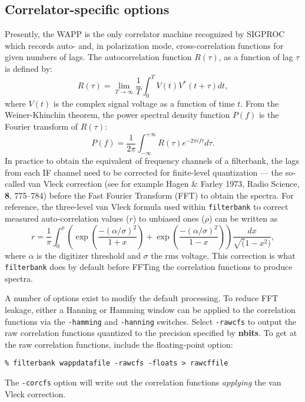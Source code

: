 \documentclass[11pt]{article}
\begin{document}
\subsection*{Correlator-specific options}
Presently, the WAPP is the only correlator machine recognized by SIGPROC
which records auto- and, in polarization mode, cross-correlation functions for 
given numbers of lags. The autocorrelation function $R(\tau)$, as a 
function of lag $\tau$ is defined by:
\begin{displaymath}
R(\tau) = \lim_{T\rightarrow\infty} \frac{1}{T} \int_0^T V(t) V^*(t+\tau) dt,
\end{displaymath}
where $V(t)$ is the complex signal voltage as a function of time $t$.
From the Weiner-Khinchin theorem, the power 
spectral density function $P(f)$ is the Fourier transform of $R(\tau)$:
\begin{displaymath}
P(f)=\frac{1}{2\pi} \int_{-\infty}^{+\infty} R(\tau) e^{-2\pi i f \tau} d\tau.
\end{displaymath}
In practice to obtain the equivalent of frequency channels of a
filterbank, the lags from each IF channel need to be corrected for
finite-level quantization --- the so-called van Vleck correction (see 
for example Hagen \& Farley 1973, Radio Science, {\bf 8}, 775--784)
before the Fast Fourier Transform (FFT) to obtain the spectra. For
reference, the three-level van Vleck formula used within {\tt filterbank} to 
correct measured auto-correlation values ($r$) to unbiased ones ($\rho$)
can be written as
\begin{displaymath}
r = \frac{1}{\pi} \int_0^{\rho} \left(
\exp \left( \frac{-(\alpha/\sigma)^2}{1+x} \right) +
\exp \left( \frac{-(\alpha/\sigma)^2}{1-x} \right) \right)
\frac{dx}{\sqrt(1-x^2)},
\end{displaymath}
where $\alpha$ is the digitizer threshold and $\sigma$ the rms
voltage. This correction is what {\tt filterbank} does by default
before FFTing the correlation functions to produce spectra. 

A number of options exist to modify the default processing.
To reduce FFT leakage, either a Hanning or Hamming window
can be applied to the correlation functions via the
{\tt -hamming} and {\tt -hanning} switches. Select {\tt -rawcfs} to
output the raw correlation functions quantized to the precision
specified by {\bf nbits}.  To get at the raw correlation functions,
include the floating-point option:
\begin{verbatim}
% filterbank wappdatafile -rawcfs -floats > rawcffile
\end{verbatim}
The {\tt -corcfs} option will write out the correlation 
functions {\sl applying} the van Vleck correction.
\end{document}
